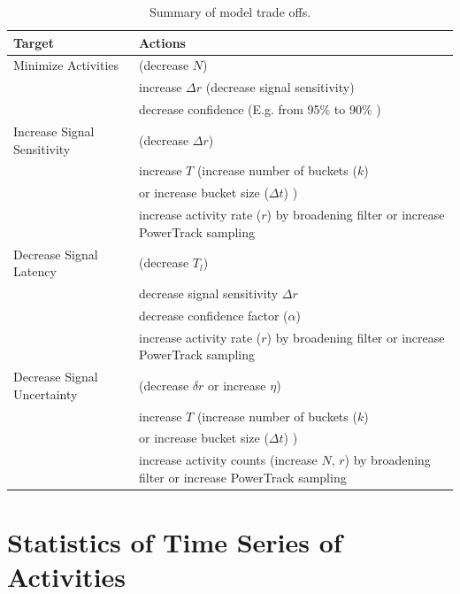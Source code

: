 \documentclass{article}
\begin{document}
\begin{table}
    \begin{tabular}{ m{4cm}| m{7cm}}
     \hline
Target  & Actions \\
\hline
Minimize Activities  & (decrease $N$)  \\
                                  & increase $\Delta r$ (decrease signal sensitivity)  \\
                                  & decrease confidence (E.g. from 95\% to 90\% )  \\
\hline	
Increase Signal Sensitivity   & (decrease $\Delta r$)  \\
                                  & increase $T$ (increase number of buckets ($k$)  \\
                                  & or increase bucket size ($\Delta t$) )  \\
                                  & increase activity rate ($r$) by broadening filter or increase PowerTrack sampling \\
\hline
Decrease Signal Latency      & (decrease $T_l$)  \\
                                 & decrease signal sensitivity $\Delta r$  \\
                                 & decrease confidence factor ($\alpha$) \\
                                 & increase activity rate ($r$) by broadening filter or increase PowerTrack sampling \\
\hline
Decrease Signal Uncertainty & (decrease $\delta r$ or increase $\eta$) \\
                          	 & increase $T$ (increase number of buckets ($k$)  \\
                                 & or increase bucket size ($\Delta t$) )  \\
                                 & increase activity counts (increase $N$, $r$) by broadening filter or increase PowerTrack sampling \\
\hline
\end{tabular}
\caption{Summary of model trade offs.}
\label{tab:tradeoff}

\end{table}


\section{Statistics of Time Series of Activities} 
\end{document}
